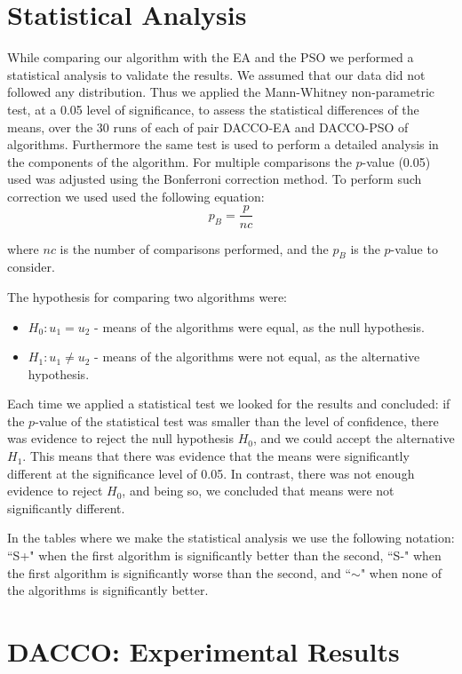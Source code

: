 \section{Statistical Analysis}
\label{sec:statistical_analysis}
While comparing our algorithm with the EA and the PSO we performed a statistical analysis to validate the results. We assumed that our data did not followed any distribution. Thus we applied the Mann-Whitney non-parametric test, at a 0.05 level of significance, to assess the statistical differences of the means, over the 30 runs of each of pair DACCO-EA and DACCO-PSO of algorithms. Furthermore the same test is used to perform a detailed analysis in the components of the algorithm. For multiple comparisons the $p$-value (0.05) used was adjusted using the Bonferroni correction method. To perform such correction we used used the following equation:
\begin{equation}
	p_B = \frac{p} {nc}
\end{equation}

where $nc$ is the number of comparisons performed, and the $p_B$ is the $p$-value to consider.

The hypothesis for comparing two algorithms were:
\begin{itemize}
	\item $H_{0} : u_1 = u_2$ - means of the algorithms were equal, as the null hypothesis.
	\item $H_{1} : u_1 \neq u_2$ - means of the algorithms were not equal, as the alternative hypothesis.
\end{itemize}

Each time we applied a statistical test we looked for the results and concluded: if the $p$-value of the statistical test was smaller than the level of confidence, there was evidence to reject the null hypothesis $H_{0}$, and we could accept the alternative $H_{1}$. This means that there was evidence that the means were significantly different  at the significance level of 0.05. In contrast, there was not enough evidence to reject $H_{0}$, and being so, we concluded that means were not significantly different.

In the tables where we make the statistical analysis we use the following notation: ``S+" when the first algorithm is significantly better than the second, ``S-" when the first algorithm is significantly worse than the second, and ``$\sim$" when none of the algorithms is significantly better.



\section{DACCO: Experimental Results}
\label{sec:experimental_results}
	

